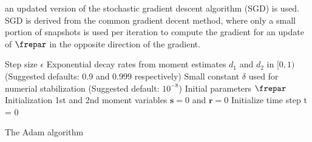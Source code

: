 an updated version of the stochastic gradient descent algorithm (SGD) is used. SGD is derived from the common gradient decent method, where only a small portion of snapshots is used per iteration to compute the gradient for an update of \(\frepar\) in the opposite direction of the gradient. \\
\begin{algorithm}[H]
	\begin{algorithmic}
		\SetAlgoLined
		\REQUIRE Step size $\epsilon$
		\REQUIRE Exponential decay rates from moment estimates $d_1$ and $d_2$ in \([0,1)\)\\
		(Suggested defaults: 0.9 and 0.999 respectively)
		\REQUIRE Small constant $\delta$ used for numerial stabilization (Suggested default: $10^{-8}$)
		\REQUIRE Initial parameters $\frepar$\\
		Initialization 1st and 2nd moment variables \(\mathbf{s}=0\) and \(\mathbf{r}=0\)\;
		Initialize time step t = 0\;
	\end{algorithmic}
		\caption{The Adam algorithm}
		\label{Alg:Adam}
\end{algorithm} 

